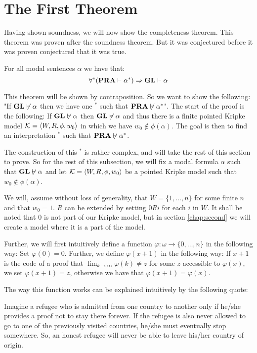 \documentclass[../main.tex]{subfiles}
\begin{document}
\section{The First Theorem}
Having shown soundness, we will now show the completeness theorem. This theorem
was proven after the soundness theorem. But it was conjectured  before it was
proven conjectured that it was true. 

\begin{thm}
	For all modal sentences $\alpha$ we have that:
	\[\forall ^* (\text{\textbf{PRA}}\vdash \alpha^*)\Rightarrow \text{\textbf{GL}}\vdash \alpha\]
\end{thm}

This theorem will be shown by contraposition. So we want to show the following:
"If $\text{\textbf{GL}}\not\vdash \alpha$ then we
have one $^*$ such that $\text{\textbf{PRA}}\not\vdash\alpha^*$". 
The start of the proof is the following: If $\text{\textbf{GL}}\not\vdash\alpha$ then
$\text{\textbf{GL}}\not\vDash\alpha$ and thus there is a finite pointed Kripke model $\mathcal{K}=\langle
W,R,\phi,w_0\rangle$ in which we have $w_0\not\in\phi(\alpha)$. The goal is then to
find an interpretation $^*$ such that $\text{\textbf{PRA}}\not\vdash\alpha^*$.

The construction of this
$^*$ is rather complex, and will take the rest of this section to prove. So for the
rest of this subsection, we will fix a modal formula $\alpha$ such that $\text{\textbf{GL}}\not\vdash
\alpha$
and let $\mathcal{K}=\langle W,R,\phi,w_0\rangle$ be a pointed Kripke model such that
$w_0\not\in\phi(\alpha)$.

We will, assume without loss of generality,  
that $W=\{1,\ldots, n\}$ for some finite $n$ and that $w_0=1$.
$R$ can be extended by setting $0Ri$ for each $i$ in $W$. It shall be noted
that $0$ is not part of our Kripke model, but  in section
\ref{chap:second} we will create a model where it is a part of the model.

Further, we will first intuitively define a function $\varphi:\omega\rightarrow\{0,\ldots, n\}$ in the
following way: Set $\varphi(0)=0$. Further, we define $\varphi(x+1)$ in the following way:
If $x+1$ is the code of a proof that $\lim_{k\rightarrow\infty}\varphi(k)\not =z$ for
some $z$ accessible to $\varphi(x)$, we set $\varphi(x+1)=z$, otherwise we have that
$\varphi(x+1)=\varphi(x)$.

The way this function works can be explained intuitively by the following
quote:
\begin{displayquote}
	Imagine a refugee who is admitted from one country to another only if
	he/she provides a proof not to stay there forever. If the refugee is
	also never allowed to go to one of the previously visited countries,
	he/she must eventually stop somewhere. So, an honest refugee will never
	be able to leave his/her country of origin. \parencite{ArteBe}
\end{displayquote}
\end{document}
